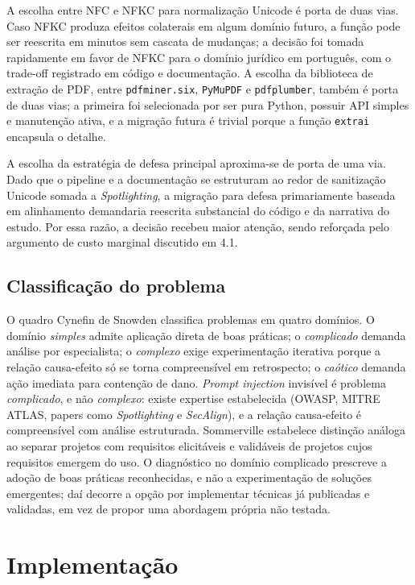 \documentclass[11pt,a4paper]{article}
\begin{document}
A escolha entre NFC e NFKC para normalização Unicode é porta de duas vias. Caso NFKC produza efeitos colaterais em algum domínio futuro, a função pode ser reescrita em minutos sem cascata de mudanças; a decisão foi tomada rapidamente em favor de NFKC para o domínio jurídico em português, com o trade-off registrado em código e documentação. A escolha da biblioteca de extração de PDF, entre \texttt{pdfminer.six}, \texttt{PyMuPDF} e \texttt{pdfplumber}, também é porta de duas vias; a primeira foi selecionada por ser pura Python, possuir API simples e manutenção ativa, e a migração futura é trivial porque a função \texttt{extrai} encapsula o detalhe.

A escolha da estratégia de defesa principal aproxima-se de porta de uma via. Dado que o pipeline e a documentação se estruturam ao redor de sanitização Unicode somada a \emph{Spotlighting}, a migração para defesa primariamente baseada em alinhamento demandaria reescrita substancial do código e da narrativa do estudo. Por essa razão, a decisão recebeu maior atenção, sendo reforçada pelo argumento de custo marginal discutido em 4.1.

\subsection{Classificação do problema}

O quadro Cynefin de Snowden \cite{snowden2007} classifica problemas em quatro domínios. O domínio \emph{simples} admite aplicação direta de boas práticas; o \emph{complicado} demanda análise por especialista; o \emph{complexo} exige experimentação iterativa porque a relação causa-efeito só se torna compreensível em retrospecto; o \emph{caótico} demanda ação imediata para contenção de dano. \emph{Prompt injection} invisível é problema \emph{complicado}, e não \emph{complexo}: existe expertise estabelecida (OWASP, MITRE ATLAS, papers como \emph{Spotlighting} e \emph{SecAlign}), e a relação causa-efeito é compreensível com análise estruturada. Sommerville \cite{sommerville2016} estabelece distinção análoga ao separar projetos com requisitos elicitáveis e validáveis de projetos cujos requisitos emergem do uso. O diagnóstico no domínio complicado prescreve a adoção de boas práticas reconhecidas, e não a experimentação de soluções emergentes; daí decorre a opção por implementar técnicas já publicadas e validadas, em vez de propor uma abordagem própria não testada.

\section{Implementação}
\end{document}
